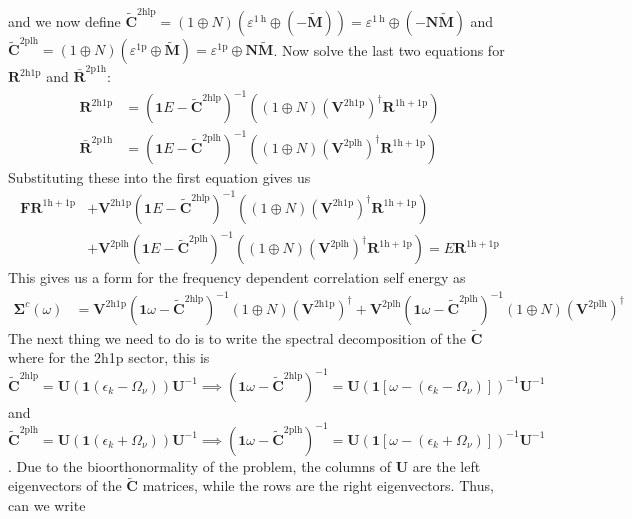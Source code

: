 and we now define $\bm{\tilde{C}}^{2\mathrm{hlp}} = \left(1\oplus N\right) \left(\varepsilon^{1\mathrm{~h}} \oplus (-\bm{\tilde{M}})\right) = \varepsilon^{1\mathrm{~h}} \oplus (-\bm{N}\bm{\tilde{M}})$ and $\bm{\tilde{C}}^{2\mathrm{plh}} = \left(1\oplus N\right)\left(\varepsilon^{1\mathrm{p}} \oplus \bm{\tilde{M}}\right) = \varepsilon^{1\mathrm{p}} \oplus \bm{N}\bm{\tilde{M}}$.
Now solve the last two equations for $\bm{R}^{2\mathrm{h}1\mathrm{p}}$ and $\bm{\bar{R}}^{2\mathrm{p}1\mathrm{h}}$:
\begin{align}
\bm{R}^{2\mathrm{h}1\mathrm{p}} &= \left(\bm{1}E - \bm{\tilde{C}}^{2\mathrm{hlp}}\right)^{-1} \left( \left(1\oplus N\right)\left(\bm{V}^{2\mathrm{h}1\mathrm{p}}\right)^\dagger \bm{R}^{1\mathrm{h}+1\mathrm{p}} \right)\\
\bm{\bar{R}}^{2\mathrm{p}1\mathrm{h}} &= \left(\bm{1}E - \bm{\tilde{C}}^{2\mathrm{plh}}\right)^{-1} \left( \left(1\oplus N\right)\left(\bm{V}^{2\mathrm{plh}}\right)^\dagger \bm{R}^{1\mathrm{h}+1\mathrm{p}} \right)
\end{align}
Substituting these into the first equation gives us
\begin{align}
\bm{F} \bm{R}^{1\mathrm{h}+1\mathrm{p}} &+ \bm{V}^{2\mathrm{h}1\mathrm{p}} \left(\bm{1}E - \bm{\tilde{C}}^{2\mathrm{hlp}}\right)^{-1} \left( \left(1\oplus N\right)\left(\bm{V}^{2\mathrm{h}1\mathrm{p}}\right)^\dagger \bm{R}^{1\mathrm{h}+1\mathrm{p}} \right)\\
&+  \bm{V}^{2\mathrm{plh}} \left(\bm{1}E - \bm{\tilde{C}}^{2\mathrm{plh}}\right)^{-1} \left( \left(1\oplus N\right)\left(\bm{V}^{2\mathrm{plh}}\right)^\dagger \bm{R}^{1\mathrm{h}+1\mathrm{p}} \right) = E \bm{R}^{1\mathrm{h}+1\mathrm{p}}
\end{align}
This gives us a form for the frequency dependent correlation self energy as
\begin{align}
\bm{\Sigma }^c(\omega ) &= \bm{V}^{2\mathrm{h}1\mathrm{p}} \left(\bm{1}\omega  - \bm{\tilde{C}}^{2\mathrm{hlp}}\right)^{-1} \left(1\oplus N\right) \left(\bm{V}^{2\mathrm{h}1\mathrm{p}}\right)^\dagger +  \bm{V}^{2\mathrm{plh}} \left(\bm{1}\omega  - \bm{\tilde{C}}^{2\mathrm{plh}}\right)^{-1} \left(1\oplus N\right)\left(\bm{V}^{2\mathrm{plh}}\right)^\dagger
\end{align}
 The next thing we need to do is to write the spectral decomposition of the $\bm{\tilde{C}}$ where for the 2h1p sector, this is $\bm{\tilde{C}}^{2\mathrm{hlp}} = \bm{U} \left(\bm{1}\left(\epsilon_k - \Omega_{\nu}\right)\right) \bm{U}^{-1} \implies \left( \bm{1}\omega  - \bm{\tilde{C}}^{2\mathrm{hlp}}\right)^{-1} = \bm{U} \left(\bm{1}\left[ \omega - \left(\epsilon_k - \Omega_\nu\right)\right]\right)^{-1} \bm{U}^{-1}$ and $\bm{\tilde{C}}^{2\mathrm{plh}} = \bm{U} \left(\bm{1}\left(\epsilon_k + \Omega_{\nu}\right)\right) \bm{U}^{-1} \implies \left( \bm{1}\omega  - \bm{\tilde{C}}^{2\mathrm{plh}}\right)^{-1} = \bm{U} \left(\bm{1}\left[ \omega  - \left(\epsilon_k + \Omega_\nu\right)\right]\right)^{-1} \bm{U}^{-1}$. Due to the bioorthonormality of the problem, the columns of $\bm{U}$ are the left eigenvectors of the $\bm{\tilde{C}}$ matrices, while the rows are the right eigenvectors. Thus, can we write
